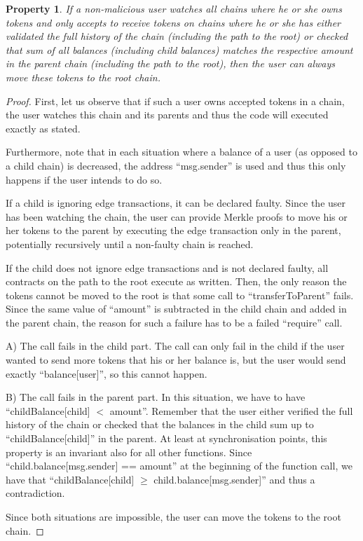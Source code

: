 \documentclass[letterpaper, 11pt]{article}
\newtheorem{property}[dummytheorem]{Property}
\begin{document}
\begin{property}
If a non-malicious user watches all chains where he or she owns tokens and only accepts to receive
tokens on chains where he or she has either validated the full history of the chain
(including the path to the root) or
checked that sum of all balances (including child balances) matches the respective amount in the parent chain
(including the path to the root), then the user
can always move these tokens to the root chain.
\end{property}
\begin{proof}
First, let us observe that if such a user owns accepted tokens in a chain, the user
watches this chain and its parents and thus the code will executed exactly as stated.

Furthermore, note that in each situation where a balance of a user (as opposed
to a child chain) is decreased, the address ``msg.sender'' is used and thus
this only happens if the user intends to do so.

If a child is ignoring edge transactions, it can be declared faulty.
Since the user has been watching the chain, the user can provide Merkle
proofs to move his or her tokens to the parent by executing the edge
transaction only in the parent, potentially recursively until a non-faulty chain is reached.

If the child does not ignore edge transactions and is not declared faulty,
all contracts on the path to the root execute as written.
Then, the only reason the tokens cannot be moved to the root
is that some call to ``transferToParent'' fails. Since the same value of
``amount'' is subtracted in the child chain and added in the parent chain,
the reason for such a failure has to be a failed ``require'' call.

A) The call fails in the child part. The call can only fail in the child if the
user wanted to send more tokens that his or her balance is, but the user
would send exactly ``balance[user]'', so this cannot happen.

B) The call fails in the parent part. In this situation, we have to have
``childBalance[child] $<$ amount''. Remember that the user either verified
the full history of the chain or checked that the balances in the
child sum up to ``childBalance[child]'' in the parent. At least at synchronisation
points, this property is an invariant also for all other functions.
Since ``child.balance[msg.sender] == amount'' at the beginning of the
function call, we have that ``childBalance[child] $\ge$ child.balance[msg.sender]''
and thus a contradiction.

Since both situations are impossible, the user can move the tokens
to the root chain.
\end{proof}
\end{document}

